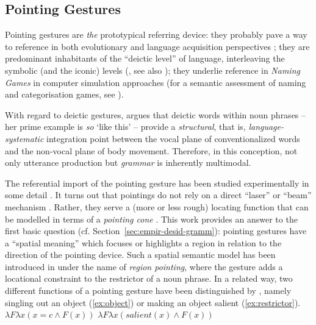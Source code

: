\documentclass[output=paper,biblatex,babelshorthands,newtxmath,draftmode,colorlinks,citecolor=brown]{langscibook}
\begin{document}
\subsection{Pointing Gestures}
\label{sec:pointing-gestures}

{}
Pointing gestures are \emph{the} prototypical referring device:
%
they probably pave a way to reference in both evolutionary and language acquisition perspectives \citep{Bruner:1998,Masataka:2003,Matthews:Behne:Lieven:Tomasello:2012};
%
they are predominant inhabitants of the \enquote{deictic level} of language, interleaving the symbolic (and the iconic) levels (\citealp{Levinson:2008}, see also \citealp{Buehler:1934:ORIG});
%
they underlie reference in \textit{Naming Games} in computer simulation approaches \citep{Steels:1995} (for a semantic assessment of naming and categorisation games, see \citealp{Luecking:Mehler:2012}).

\largerpage[2] 
With regard to deictic gestures, \citet[Section~5.4]{Fricke:2012} argues that deictic
words within noun phrases -- her prime example is  \emph{so} `like
this' -- provide a \emph{structural}, that is, \emph{language-systematic} integration point between
the vocal plane of conventionalized words and the non-vocal plane of body
movement.
%
Therefore, in this conception, not only utterance production but \emph{grammar} is inherently multimodal.

The referential import of the pointing gesture has been studied experimentally in some detail \citep{Bangerter:Oppenheimer:2006,Kranstedt:Luecking:Pfeiffer:Rieser:Wachsmuth:2006:a,Kranstedt:Luecking:Pfeiffer:Rieser:Wachsmuth:2006:b,van:der:Sluis:Krahmer:2007}. 
%
It turns out that pointings do not rely on a direct \enquote{laser} or \enquote{beam} mechanism \citep{McGinn:1981}.
%
Rather, they serve a (more or less rough) locating function \citep{Clark:1996} that can be modelled in terms of a \emph{pointing cone} \citep{Kranstedt:Luecking:Pfeiffer:Rieser:Wachsmuth:2006:a,Luecking:Pfeiffer:Rieser:2015}.
%
This work provides an answer to the first basic question (cf. Section~\ref{sec:empir-desid-gramm}): pointing gestures have a \enquote{spatial meaning} which focuses or highlights a region in relation to the direction of the pointing device.
%
Such a spatial semantic model has been introduced in \citet{Rieser:2004} under the name of \emph{region pointing}, where the gesture adds a locational constraint to the restrictor of a noun phrase.
%
In a related way, two different functions of a pointing gesture have been distinguished by \citet{Kuehnlein:Nimke:Stegmann:2002}, namely singling out an object (\ref{ex:object}) or making an object salient (\ref{ex:restrictor}).
%
\ea \label{ex:pointing-functions}
\ea \label{ex:object}
$\lambda F \lambda x (x = c \wedge F(x))$
\ex \label{ex:restrictor}
$\lambda F \lambda x (\textit{salient}(x) \wedge F(x))$
\z 
\z
\end{document}
